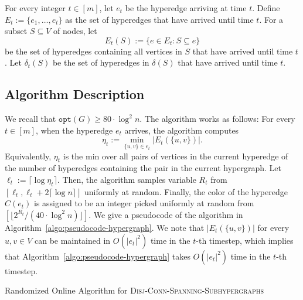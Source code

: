 \documentclass[11pt]{article}
\theoremstyle{definition}
\newcommand{\DCSS}{\textsc{Disj-Conn-Spanning-Subhypergraphs}\xspace}
\newcommand{\opt}{\texttt{opt}}
\begin{document}
For every integer $t\in [m]$, let $e_t$ be the hyperedge arriving at time $t$. Define $E_t:=\{e_1, \ldots, e_t\}$ as the set of hyperedges that have arrived until time $t$. For a subset $S\subseteq V$ of nodes, let 
\[
E_t(S):=\{e\in E_t: S\subseteq e\}
\]
be the set of hyperedges containing all vertices in $S$ that have arrived until time $t$. Let $\delta_t(S)$ be the set of hyperedges in $\delta(S)$ that have arrived until time $t$.

\subsection{Algorithm Description}\label{subsection:algorithm-property}
We recall that $\opt(G)\geq 80\cdot \log^2 n$. The algorithm works as follows: For every $t\in [m]$, when the hyperedge $e_t$ arrives, the algorithm computes $$\eta_t:=\min_{\{u,v\}\in e_t}|E_t(\{u,v\})|.$$ Equivalently, $\eta_t$ is the min over all pairs of vertices in the current hyperedge of the number of hyperedges containing the pair in the current hypergraph. Let $\ell_t:=\lceil \log \eta_t\rceil$. Then, the algorithm samples variable $R_t$ from $[\ell_t, \ell_t+2\lceil\log n\rceil]$ uniformly at random. Finally, the color of the hyperedge $C(e_t)$ is assigned to be an integer picked uniformly at random from $[\lfloor 2^{R_t}/(40\cdot \log ^2n) \rfloor]$. We give a pseudocode of the algorithm in Algorithm~\ref{algo:pseudocode-hypergraph}. We note that $|E_t(\{u,v\})|$ for every $u,v \in V$ can be maintained in $O(|e_t|^2)$ time in the $t$-th timestep, which implies that Algorithm~\ref{algo:pseudocode-hypergraph} takes $O(|e_t|^2)$ time in the $t$-th timestep.

\begin{algorithm2e}[ht]
\caption{Randomized Online Algorithm for \DCSS}
\label{algo:pseudocode-hypergraph}
                              \LinesNumbered

\DontPrintSemicolon
  
    
\end{algorithm2e}
\end{document}
